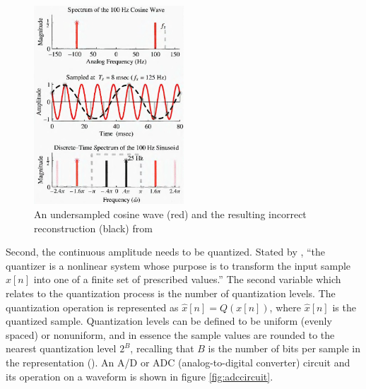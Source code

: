 \documentclass[report.tex]{subfiles}
\begin{document}
\begin{figure}[ht]
	\centering
	\includegraphics[width=0.5\textwidth]{./images-tftheory/aliasing_undersampling.png}
	\caption{An undersampled cosine wave (red) and the resulting incorrect reconstruction (black) from \textcite{dspfirst}}
	\label{fig:aliasing}
\end{figure}

Second, the continuous amplitude needs to be quantized. Stated by \textcite[Chapter~4]{discretebook}, ``the quantizer is a nonlinear system whose purpose is to transform the input sample $x[n]$ into one of a finite set of prescribed values.'' The second variable which relates to the quantization process is the number of quantization levels. The quantization operation is represented as $ \hat{x}[n] = Q(x[n])$, where $\hat{x}[n]$ is the quantized sample. Quantization levels can be defined to be uniform (evenly spaced) or nonuniform, and in essence the sample values are rounded to the nearest quantization level $2^{B}$, recalling that $B$ is the number of bits per sample in the representation (\cite{discretebook}). An A/D or ADC (analog-to-digital converter) circuit and its operation on a waveform is shown in figure \ref{fig:adccircuit}.
\end{document}
